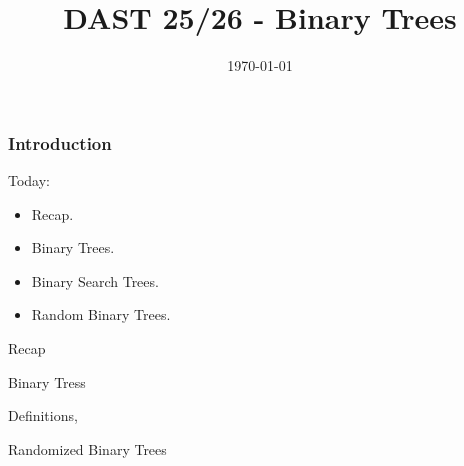 \documentclass{beamer}
\begin{document}
 

\newcommand*{\Tr}{\textbf{Tr }}



\begin{frame}
  \title{ DAST 25/26 - Binary Trees }
    \date{\today}
    \titlepage
\end{frame}


\begin{frame}

\frametitle{Introduction}
\begin{block}{Today:}
\begin{itemize}
  \item Recap. 
  \item Binary Trees.
  \item Binary Search Trees.
  \item  Random Binary Trees. 
\end{itemize}
\end{block}
\end{frame}

\begin{frame}{Recap}
  \begin{block}
\end{block}

\end{frame}





\begin{frame}{Binary Tress}

Definitions, 




\end{frame}


\begin{frame}


\end{frame}
\begin{frame}


\end{frame}
\begin{frame}


\end{frame}
\begin{frame}


\end{frame}

\begin{frame}{Randomized Binary Trees}

\end{frame}
\end{document}
